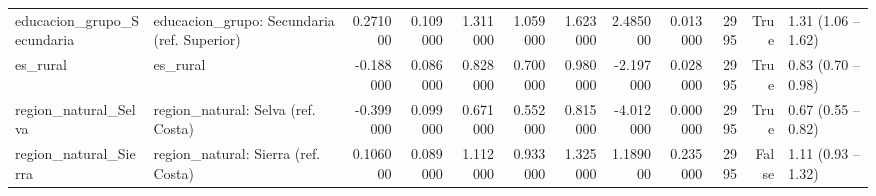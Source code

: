 \begin{table}[htbp]
\begin{tabular}{llrrrrrrrrrl}
educacion\_grupo\_Secundaria & educacion\_grupo: Secundaria (ref. Superior) & 0.271000 & 0.109000 & 1.311000 & 1.059000 & 1.623000 & 2.485000 & 0.013000 & 2995 & True & 1.31 (1.06 – 1.62) \\
es\_rural & es\_rural & -0.188000 & 0.086000 & 0.828000 & 0.700000 & 0.980000 & -2.197000 & 0.028000 & 2995 & True & 0.83 (0.70 – 0.98) \\
region\_natural\_Selva & region\_natural: Selva (ref. Costa) & -0.399000 & 0.099000 & 0.671000 & 0.552000 & 0.815000 & -4.012000 & 0.000000 & 2995 & True & 0.67 (0.55 – 0.82) \\
region\_natural\_Sierra & region\_natural: Sierra (ref. Costa) & 0.106000 & 0.089000 & 1.112000 & 0.933000 & 1.325000 & 1.189000 & 0.235000 & 2995 & False & 1.11 (0.93 – 1.32) \\
\bottomrule
\end{tabular}
\end{table}
